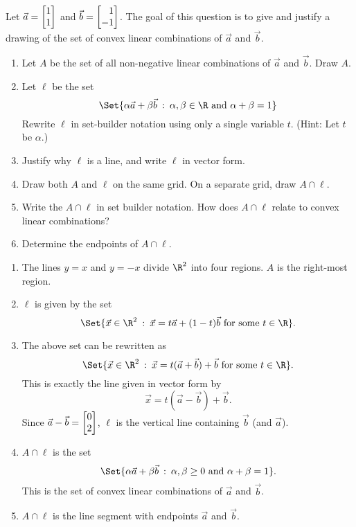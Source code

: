 \begin{exercises}
\begin{problist}
	\prob
		Let $\vec a=\mat{1 \\1}$ and $\vec b=\mat{1 \\ -1}$. 
		The goal of this question is to give and justify a drawing of the set of convex linear combinations of $\vec a$ and $\vec b$.
		\begin{enumerate}
			\item Let $A$ be the set of all non-negative linear combinations of $\vec a$ and $\vec b$. Draw $A$.
			\item Let $\ell$ be the set 
			\[
				\Set{\alpha \vec a + \beta \vec b\given \alpha, \beta \in \R\text{ and } \alpha+\beta = 1}
			\]
			Rewrite $\ell$ in set-builder notation using only a single variable $t$. (Hint: Let $t$ be $\alpha$.)
			\item Justify why $\ell$ is a line, and write $\ell$ in vector form.
			\item Draw both $A$ and $\ell$ on the same grid. On a separate grid, draw $A\cap \ell$.
			\item	Write the $A \cap \ell$ in set builder notation. 
				How does $A\cap \ell$ relate to convex linear combinations?
			\item Determine the endpoints of $A \cap \ell$.
		\end{enumerate}
		\begin{solution}
			\begin{enumerate}
				\item The lines $y=x$ and $y= -x$ divide $\R^{2}$ into four
				regions. $A$ is the right-most region. 
				\item $\ell$
				is given by the set
				\[
					\Set{\vec x\in\R^2\given \vec x=t \vec a + (1-t) \vec b\text{ for some }t\in\R}.
				\]
				 \item The above set can be rewritten as
				\[
					\Set{\vec x\in\R^2\given \vec x=t (\vec a + \vec b)+\vec b\text{ for some }t\in\R}.
				\]
				 This is exactly the line given in vector form by
				\[
					\vec x = t(\vec a - \vec b)+\vec b.
				\]
				Since $\vec a-\vec b=\mat{0\\2}$, 
				$\ell$ is the vertical line containing $\vec b$ (and $\vec a$).

				\item $A \cap \ell$ is the set
				\[
					\Set{\alpha \vec a+\beta \vec b\given \alpha,\beta \geq 0\text{ and }
					\alpha+\beta = 1}.
				\]
				This is the set of convex linear
				combinations of $\vec a$ and $\vec b$. 
				\item $A
				\cap \ell$ is the line segment with endpoints $\vec a$ and $\vec b$.
			\end{enumerate}
		\end{solution}


\end{problist}
\end{exercises}

